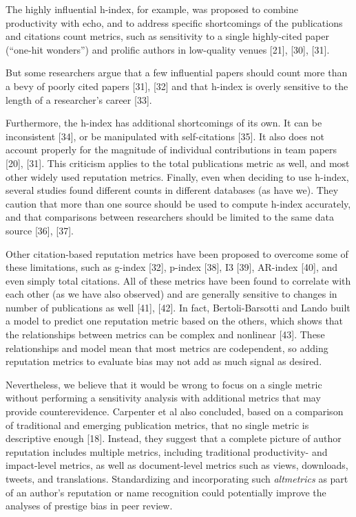 \documentclass[12pt]{article}
\begin{document}
The highly influential h-index, for example, was proposed to combine productivity with echo, and to address specific shortcomings of the publications and citations count metrics, such as sensitivity to a single highly-cited paper (``one-hit wonders'') and prolific authors in low-quality venues {[}21{]}, {[}30{]}, {[}31{]}.

But some researchers argue that a few influential papers should count more than a bevy of poorly cited papers {[}31{]}, {[}32{]} and that h-index is overly sensitive to the length of a researcher's career {[}33{]}.

Furthermore, the h-index has additional shortcomings of its own.
It can be inconsistent {[}34{]}, or be manipulated with self-citations {[}35{]}.
It also does not account properly for the magnitude of individual contributions in team papers {[}20{]}, {[}31{]}.
This criticism applies to the total publications metric as well, and most other widely used reputation metrics.
Finally, even when deciding to use h-index, several studies found different counts in different databases (as have we).
They caution that more than one source should be used to compute h-index accurately, and that comparisons between researchers should be limited to the same data source {[}36{]}, {[}37{]}.

Other citation-based reputation metrics have been proposed to overcome some of these limitations, such as g-index {[}32{]}, p-index {[}38{]}, I3 {[}39{]}, AR-index {[}40{]}, and even simply total citations.
All of these metrics have been found to correlate with each other (as we have also observed) and are generally sensitive to changes in number of publications as well {[}41{]}, {[}42{]}.
In fact, Bertoli-Barsotti and Lando built a model to predict one reputation metric based on the others, which shows that the relationships between metrics can be complex and nonlinear {[}43{]}.
These relationships and model mean that most metrics are codependent, so adding reputation metrics to evaluate bias may not add as much signal as desired.

Nevertheless, we believe that it would be wrong to focus on a single metric without performing a sensitivity analysis with additional metrics that may provide counterevidence.
Carpenter et al also concluded, based on a comparison of traditional and emerging publication metrics, that no single metric is descriptive enough {[}18{]}.
Instead, they suggest that a complete picture of author reputation includes multiple metrics, including traditional productivity- and impact-level metrics, as well as document-level metrics such as views, downloads, tweets, and translations.
Standardizing and incorporating such \emph{altmetrics} as part of an author's reputation or name recognition could potentially improve the analyses of prestige bias in peer review.
\end{document}
